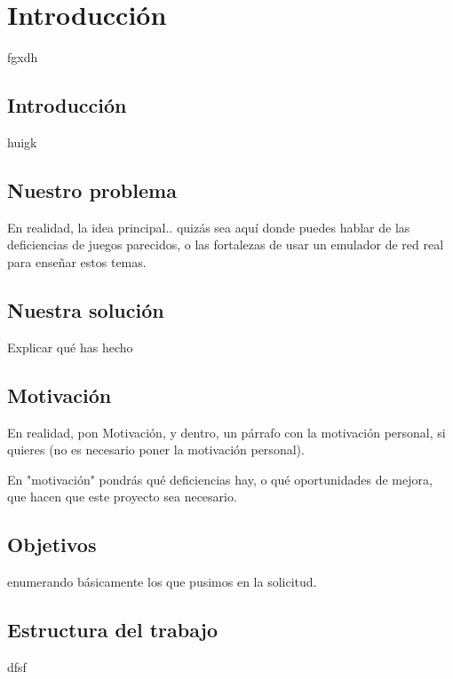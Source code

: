 \chapter{Introducción}\label{chap:Intro}

fgxdh

\section{Introducción}

huigk

\section{Nuestro problema}
En realidad, la idea principal.. quizás sea aquí donde puedes hablar de las deficiencias de juegos parecidos, o las fortalezas de usar un emulador de red real para enseñar estos temas.

\section{Nuestra solución}

Explicar qué has hecho

\section{Motivación}
En realidad, pon Motivación, y dentro, un párrafo con la motivación personal, si quieres (no es necesario poner la motivación personal).

 En "motivación" pondrás qué deficiencias hay, o qué oportunidades de mejora, que hacen que este proyecto sea necesario.
 
\section{Objetivos}
enumerando básicamente los que pusimos en la solicitud.

\section{Estructura del trabajo}
dfsf
